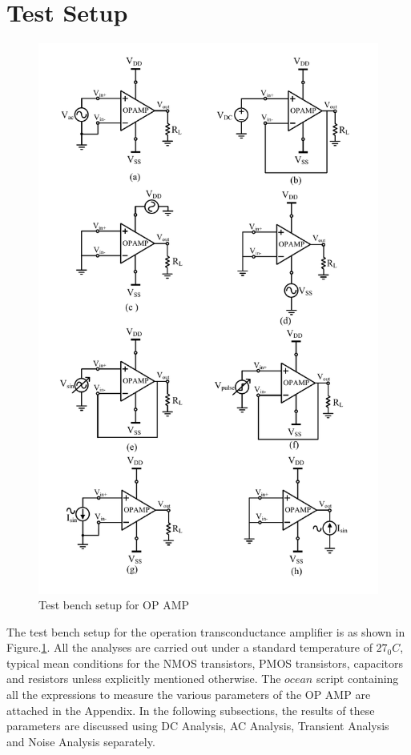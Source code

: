 \section{Test Setup}
\begin{figure} [H]
\centering
\includegraphics[scale=0.8]{Figures/Test_Benches/OPAMP_TB.pdf}
\caption{Test bench setup for OP AMP}
\label{fig:OPAMP_TB}
\end{figure}

The test bench setup for the operation transconductance amplifier is as shown in Figure.\ref{fig:OPAMP_TB}. All the analyses are carried out under a standard temperature of $27_0C$, typical mean conditions for the NMOS transistors, PMOS transistors, capacitors and resistors unless explicitly mentioned otherwise. The $ocean$ script containing all the expressions to measure the various parameters of the OP AMP are attached in the Appendix. In the following subsections, the results of these parameters are discussed using DC Analysis, AC Analysis, Transient Analysis and Noise Analysis separately.

